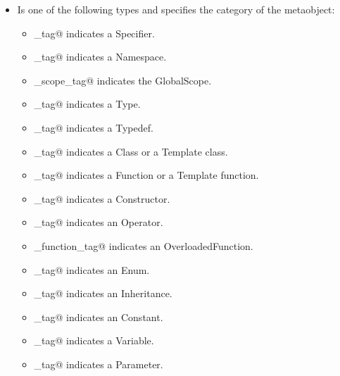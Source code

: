 \begin{itemize}
\item{\verb@category@} Is one of the following types and specifies the category
of the metaobject:
	\begin{itemize}
		\item{\verb@specifier_tag@} indicates a {\metaobject Specifier}.

		\item{\verb@namespace_tag@} indicates a {\metaobject Namespace}.

		\item{\verb@global_scope_tag@} indicates the {\metaobject GlobalScope}.

		\item{\verb@type_tag@} indicates a {\metaobject Type}.

		\item{\verb@typedef_tag@} indicates a {\metaobject Typedef}.

		\item{\verb@class_tag@} indicates a {\metaobject Class}
		or a {\metaobject Template} class.

		\item{\verb@function_tag@} indicates a {\metaobject Function}
		or a {\metaobject Template} function.

		\item{\verb@constructor_tag@} indicates a {\metaobject Constructor}.

		\item{\verb@operator_tag@} indicates an {\metaobject Operator}.

		\item{\verb@overloaded_function_tag@} indicates an {\metaobject OverloadedFunction}.

		\item{\verb@enum_tag@} indicates an {\metaobject Enum}.

		\item{\verb@inheritance_tag@} indicates an {\metaobject Inheritance}.

		\item{\verb@constant_tag@} indicates an {\metaobject Constant}.

		\item{\verb@variable_tag@} indicates a {\metaobject Variable}.

		\item{\verb@parameter_tag@} indicates a {\metaobject Parameter}.
	\end{itemize}


\end{itemize}
